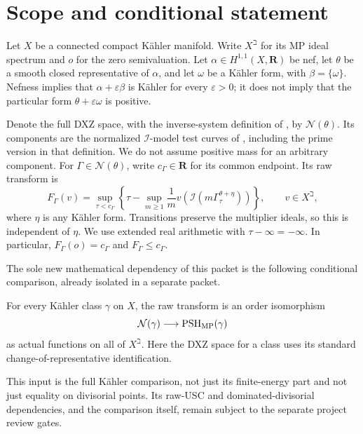 \section{Scope and conditional statement}

Let \(X\) be a connected compact K\"ahler manifold. Write
\(X^\beth\) for its MP ideal spectrum and \(o\) for the zero
semivaluation. Let \(\alpha\in H^{1,1}(X,\mathbf R)\) be nef, let
\(\theta\) be a smooth closed representative of \(\alpha\), and let
\(\omega\) be a K\"ahler form, with \(\beta=\{\omega\}\).
Nefness implies that \(\alpha+\varepsilon\beta\) is K\"ahler for
every \(\varepsilon>0\); it does not imply that the particular form
\(\theta+\varepsilon\omega\) is positive.

Denote the full DXZ space, with the inverse-system definition of
\cite[Definition~3.5]{XiaOps}, by \(\mathcal N(\theta)\). Its
components are the normalized \(\mathcal I\)-model test curves of
\cite[Definition~3.2]{XiaOps}, including the prime version in that
definition. We do not assume positive mass for an arbitrary component.
For \(\Gamma\in\mathcal N(\theta)\), write \(c_\Gamma\in\mathbf R\)
for its common endpoint. Its raw transform is
\begin{equation}\label{eq:p143n-raw}
 F_\Gamma(v)=\sup_{\tau<c_\Gamma}
 \left\{\tau-\sup_{m\geq1}\frac{1}{m}
 v\!\left(\mathcal I(m\Gamma^{\theta+\eta}_\tau)\right)\right\},
 \qquad v\in X^\beth,
\end{equation}
where \(\eta\) is any K\"ahler form. Transitions preserve the
multiplier ideals, so this is independent of \(\eta\). We use extended
real arithmetic with \(\tau-\infty=-\infty\). In particular,
\(F_\Gamma(o)=c_\Gamma\) and \(F_\Gamma\leq c_\Gamma\).

The sole new mathematical dependency of this packet is the following
conditional comparison, already isolated in a separate packet.
\begin{assumption}\label{hyp:p143n-kahler}
For every K\"ahler class \(\gamma\) on \(X\), the raw transform is
an order isomorphism
\[
 \mathcal N(\gamma)\longrightarrow\operatorname{PSH}_{\mathrm{MP}}(\gamma)
\]
as actual functions on all of \(X^\beth\). Here the DXZ space for a
class uses its standard change-of-representative identification.
\end{assumption}
This input is the full K\"ahler comparison, not just its finite-energy
part and not just equality on divisorial points. Its raw-USC and
dominated-divisorial dependencies, and the comparison itself, remain
subject to the separate project review gates.


